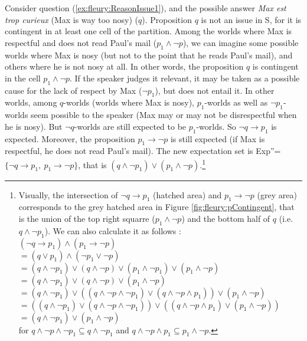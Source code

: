 \documentclass[output=paper,colorlinks,citecolor=brown,
]{langscibook}
\begin{document}
Consider question 
(\ref{ex:fleury:ReasonIssue1}), and the possible answer \textit{Max est trop curieux} 
(Max is way too nosy) ($q$).
Proposition $q$ is not an issue in S,
for it is contingent in at least one cell of the partition. Among the worlds where Max is respectful and does not read Paul's mail ($p_1 \land \neg p$), we can imagine some possible worlds where 
Max is nosy
(but not to the point that he reads Paul's mail), and others
where 
he is not nosy at all. In other words, the proposition $q$ is contingent in the cell $p_1 \land \neg p$.
%
If the speaker judges it relevant, it may be taken as a {possible cause} for the lack of respect by Max ($\neg p_1$), but does not entail it.
In other worlds, among $q$-worlds 
(worlds where Max is nosy), $p_1$-worlds as well as $\neg p_1$-worlds seem possible to the speaker 
(Max may or may not be disrespectful when he is nosy).
But $\neg q$-worlds are still expected to be $p_1$-worlds. So $\neg q\rightarrow p_1$ is expected. Moreover, the proposition $p_1\rightarrow \neg p$ is still expected (if Max is respectful, he does not read Paul's mail). The new expectation set is Exp''=$\{\neg q\rightarrow p_1,~p_1\rightarrow \neg p\}$, that is $(q \land \neg p_1) \lor (p_1 \land \neg p)$.\footnote{
Visually, the intersection of $\neg q\rightarrow p_1$ (hatched area) and $p_1\rightarrow \neg p$ (grey area) corresponds to the grey hatched area in Figure \ref{fig:fleury:pContingent}, that is the union of the top right squarre ($p_1 \land \neg p$) and the bottom half of $q$ (i.e. $q \land \neg p_1$). We can also calculate it as follows :
\\$(\neg q\rightarrow p_1) \land (p_1\rightarrow \neg p)$
\\$= (q \lor p_1) \land (\neg p_1 \lor \neg p)$
\\$= (q \land \neg p_1) \lor (q \land \neg p) \lor (p_1 \land \neg p_1) \lor (p_1 \land \neg p)$
\\$= (q \land \neg p_1) \lor (q \land \neg p) \lor (p_1 \land \neg p)$
\\$= (q \land \neg p_1) \lor ((q \land \neg p \land \neg p_1) \lor (q \land \neg p \land p_1)) \lor (p_1 \land \neg p)$
\\$= ((q \land \neg p_1) \lor (q \land \neg p \land \neg p_1)) \lor ((q \land \neg p \land p_1) \lor (p_1 \land \neg p))$
\\$= (q \land \neg p_1) \lor (p_1 \land \neg p)$
\\for $q \land \neg p \land \neg p_1 \subseteq q \land \neg p_1$ and $q \land \neg p \land p_1 \subseteq p_1 \land \neg p$.}
\end{document}
